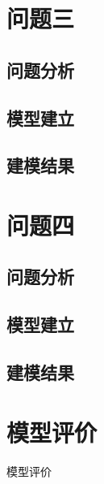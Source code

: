 \documentclass[bwprint]{gmcmthesis}
\begin{document}
\section{问题三}   %
    \subsection{问题分析}

    \subsection{模型建立}

    \subsection{建模结果}

\section{问题四}   %
    \subsection{问题分析}

    \subsection{模型建立}

    \subsection{建模结果}

\section{模型评价}  %
模型评价
\end{document}
